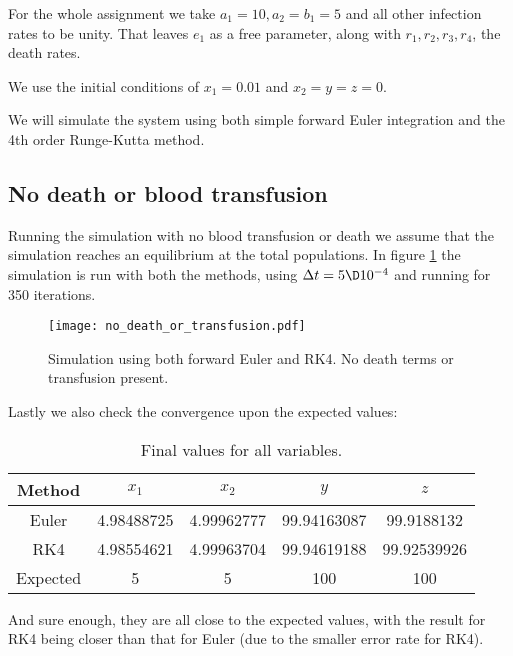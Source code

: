 \documentclass[a4paper,10pt]{article}
\begin{document}
	For the whole assignment we take $ a_1=10, a_2=b_1=5 $ and all other infection rates to be unity. That leaves $ e_1 $ as a free parameter, along with $ r_1, r_2, r_3, r_4 $, the death rates.
	
	We use the initial conditions of $ x_1 = 0.01 $ and $ x_2=y=z =0 $.

	We will simulate the system using both simple forward Euler integration and the 4th order Runge-Kutta method.
	
	\subsection*{No death or blood transfusion}
	Running the simulation with no blood transfusion or death we assume that the simulation reaches an equilibrium at the total populations. In figure \ref{fig:no_death} the simulation is run with both the methods, using $ \Delta t = 5\D 10^{-4} $ and running for 350 iterations.
	\begin{figure}[H]
		\centering
		\texttt{[image: no\_death\_or\_transfusion.pdf]}
		\caption{Simulation using both forward Euler and RK4. No death terms or transfusion present.}
		\label{fig:no_death}
	\end{figure}
	Lastly we also check the convergence upon the expected values:
	\begin{table}[H]
		\centering
		\begin{tabular}{c|c|c|c|c}
			Method & $ x_1 $ & $ x_2 $ & $ y $ & $ z $ \\
			\hline
			Euler & 4.98488725 & 4.99962777 & 99.94163087 & 99.9188132  \\
			RK4 & 4.98554621 & 4.99963704 & 99.94619188 & 99.92539926 \\
			\hline \hline
			Expected & 5 & 5 & 100 & 100
		\end{tabular}
		\caption{Final values for all variables.}
		\label{tab:final_vals1}
	\end{table}
	And sure enough, they are all close to the expected values, with the result for RK4 being closer than that for Euler (due to the smaller error rate for RK4).	
	
\end{document}
